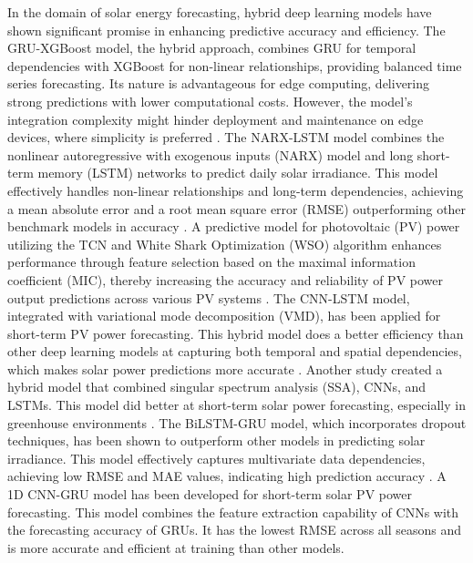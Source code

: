 \documentclass[sn-mathphys-num]{sn-jnl}%
\begin{document}
In the domain of solar energy forecasting, hybrid deep learning models have shown significant promise in enhancing predictive accuracy and efficiency. The GRU-XGBoost model, the hybrid approach, combines GRU for temporal dependencies with XGBoost for non-linear relationships, providing balanced time series forecasting. Its nature is advantageous for edge computing, delivering strong predictions with lower computational costs. However, the model's integration complexity might hinder deployment and maintenance on edge devices, where simplicity is preferred \cite{wu2021edgelstm}. The NARX-LSTM model combines the nonlinear autoregressive with exogenous inputs (NARX) model and long short-term memory (LSTM) networks to predict daily solar irradiance. This model effectively handles non-linear relationships and long-term dependencies, achieving a mean absolute error and a root mean square error (RMSE) outperforming other benchmark models in accuracy \cite{okieh2024enhanced}. A predictive model for photovoltaic (PV) power utilizing the TCN and White Shark Optimization (WSO) algorithm enhances performance through feature selection based on the maximal information coefficient (MIC), thereby increasing the accuracy and reliability of PV power output predictions across various PV systems \cite{lin2024hybrid}. The CNN-LSTM model, integrated with variational mode decomposition (VMD), has been applied for short-term PV power forecasting. This hybrid model does a better efficiency than other deep learning models at capturing both temporal and spatial dependencies, which makes solar power predictions more accurate \cite{lakhdar_nadjib_boucetta__2024}. Another study created a hybrid model that combined singular spectrum analysis (SSA), CNNs, and LSTMs. This model did better at short-term solar power forecasting, especially in greenhouse environments \cite{venkateswaran2024efficient}. The BiLSTM-GRU model, which incorporates dropout techniques, has been shown to outperform other models in predicting solar irradiance. This model effectively captures multivariate data dependencies, achieving low RMSE and MAE values, indicating high prediction accuracy \cite{michael2024cohesive} . A 1D CNN-GRU model has been developed for short-term solar PV power forecasting. This model combines the feature extraction capability of CNNs with the forecasting accuracy of GRUs. It has the lowest RMSE across all seasons and is more accurate and efficient at training than other models\cite{venkateswaran2024efficient}.
\end{document}
